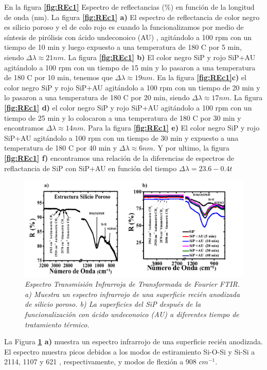 \documentclass[a4paper,11pt,]{book}
\begin{document}
En la figura \textbf{\ref{fig:REc1}} Espectro de reflectancias ($\%$) en función de la longitud de onda (nm). La figura \textbf{\ref{fig:REc1} a)} El espectro de reflectancia de color negro es silicio poroso y  el de colo rojo es cuando la funcionalizamos por medio de síntesis de pirólisis con ácido undeconoico (AU) , agitándolo a 100 rpm con un tiempo de 10 min y luego expuesto a una temperatura de 180 C por 5 min, siendo $\Delta \lambda \approx 21 nm$. La figura \textbf{\ref{fig:REc1} b)} El color negro SiP y rojo SiP+AU agitándolo a 100 rpm con un tiempo de 15 min y lo pasaron a una temperatura de 180 C por 10 min, tenemos que  $\Delta \lambda \approx 19 nm$. En la figura \textbf{\ref{fig:REc1}c)} el color negro SiP y rojo SiP+AU agitándolo a 100 rpm con un tiempo de 20 min y lo pasaron a una  temperatura de 180 C por 20 min, siendo $\Delta \lambda \approx 17 nm$.  La figura \textbf{\ref{fig:REc1} d)} el color negro SiP y rojo SiP+AU agitándolo a 100 rpm con un tiempo de 25 min y lo colocaron  a una temperatura de 180 C por 30 min y encontramos $\Delta \lambda \approx 14 nm$. Para la figura \textbf{\ref{fig:REc1} e)} El color negro SiP y rojo SiP+AU agitándolo a 100 rpm con un tiempo de 30 min y expuesto a una temperatura de 180 C por 40 min y  $\Delta \lambda \approx 6 nm$. Y por ultimo,  la  figura \textbf{\ref{fig:REc1} f)} encontramos una relación de la diferencias de espectros de reflactancia de SiP con SiP+AU  en función del tiempo $ \Delta \lambda =23.6 -0.4t$
\begin{figure}[H]
	\centering
	\includegraphics[scale=.32]{../Images/sens2}
	\caption{\emph{Espectro Transmisión Infrarroja de Transformada de Fourier FTIR. a) Muestra un espectro infrarrojo de una superficie recién
		anodizada de silicio poroso. b) La superficies del SiP después de la funcionalización con ácido undeconoico (AU) a diferentes tiempo de tratamiento térmico.}}
	\label{fig:FTIR1}
\end{figure}
La Figura \textbf{\ref{fig:FTIR1} a)} muestra un espectro infrarrojo de una superficie recién anodizada. El espectro muestra picos debidos a los modos de estiramiento Si-O-Si y Si-Si a 2114, 1107 y 621   , respectivamente, y modos de flexión a 908 $cm^{-1}$.
\end{document}
